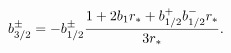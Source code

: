 \begin{equation}
b_{3/2}^{\pm}=-b_{1/2}^{\pm}{1+2b_{1}r_{*}+b_{1/2}^{+}b_{1/2}^{-}r_{*}\over3r_{*}}.
\end{equation}

